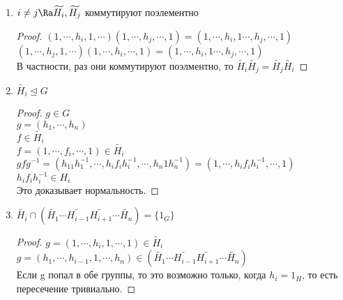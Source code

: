 \begin{conseq}\hfill
\begin{enumerate}
    \item $i \ne j \Ra \widetilde{H_i}, \widetilde{H_j}$ коммутируют поэлементно\\
    \begin{proof}
    $(1, \cdots, h_i, 1, \cdots)(1, \cdots, h_j, \cdots, 1) = (1, \cdots, h_i, 1 \cdots, h_j, \cdots, 1)$\\
    $(1, \cdots, h_j, 1, \cdots)(1, \cdots, h_i, \cdots, 1) = (1, \cdots, h_i, 1 \cdots, h_j, \cdots, 1)$\\

    В частности, раз они коммутируют поэлментно, то $\widetilde{H_i}\widetilde{H_j} = \widetilde{H_j}\widetilde{H_i}$
    \end{proof}
    \item $\widetilde{H_i} \unlhd G$\\
    \begin{proof}
    $g \in G$\\
    $g = (h_1, \cdots, h_n)$\\
    $f \in \widetilde{H_i} $\\
    $f = (1, \cdots, f_i,\cdots, 1) \in \widetilde{H_i}$\\
    $gfg^{-1} = (h_11h_1^{-1}, \cdots, h_if_ih_i^{-1}, \cdots, h_n1h_n^{-1}) = (1, \cdots, h_if_ih_i^{-1}, \cdots, 1)$\\
    $h_if_ih_i^{-1} \in H_i$\\
    Это доказывает нормальность. 
    \end{proof}
    \item $\widetilde{H_i} \cap (\widetilde{H_1} \cdots \widetilde{H_{i - 1}} \widetilde{H_{i + 1}} \cdots \widetilde{H_n}) = \{1_G\}$
    \begin{proof}
    $g = (1, \cdots, h_i, 1, \cdots, 1) \in \widetilde{H_i}$\\
    $g = (h_1, \cdots, h_{i - 1}, 1, \cdots, h_n) \in (\widetilde{H_1} \cdots \widetilde{H_{i - 1}} \widetilde{H_{i + 1}} \cdots \widetilde{H_n})$\\
    Если g попал в обе группы, то это возможно только, когда $h_i = 1_H$, то есть пересечение тривиально. 
    \end{proof}
\end{enumerate}
\end{conseq}
